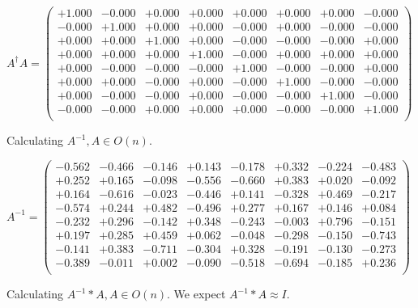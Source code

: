 \documentclass[9pt]{article}
\theoremstyle{plain}
\theoremstyle{definition}
\theoremstyle{remark}
\numberwithin{equation}{section}
\begin{document}
$A^{\dag} A = \left(
\begin{array}{
cccccccc}
+1.000 & -0.000 & +0.000 & +0.000 & +0.000 & +0.000 & +0.000 & -0.000 \\
-0.000 & +1.000 & +0.000 & +0.000 & -0.000 & +0.000 & -0.000 & -0.000 \\
+0.000 & +0.000 & +1.000 & +0.000 & -0.000 & -0.000 & -0.000 & +0.000 \\
+0.000 & +0.000 & +0.000 & +1.000 & -0.000 & +0.000 & +0.000 & +0.000 \\
+0.000 & -0.000 & -0.000 & -0.000 & +1.000 & -0.000 & -0.000 & +0.000 \\
+0.000 & +0.000 & -0.000 & +0.000 & -0.000 & +1.000 & -0.000 & -0.000 \\
+0.000 & -0.000 & -0.000 & +0.000 & -0.000 & -0.000 & +1.000 & -0.000 \\
-0.000 & -0.000 & +0.000 & +0.000 & +0.000 & -0.000 & -0.000 & +1.000 \\
\end{array}
\right)$ \newline 

Calculating $A^{-1} ,  A \in O(n)$.

$A^{-1} = \left(
\begin{array}{
cccccccc}
-0.562 & -0.466 & -0.146 & +0.143 & -0.178 & +0.332 & -0.224 & -0.483 \\
+0.252 & +0.165 & -0.098 & -0.556 & -0.660 & +0.383 & +0.020 & -0.092 \\
+0.164 & -0.616 & -0.023 & -0.446 & +0.141 & -0.328 & +0.469 & -0.217 \\
-0.574 & +0.244 & +0.482 & -0.496 & +0.277 & +0.167 & +0.146 & +0.084 \\
-0.232 & +0.296 & -0.142 & +0.348 & -0.243 & -0.003 & +0.796 & -0.151 \\
+0.197 & +0.285 & +0.459 & +0.062 & -0.048 & -0.298 & -0.150 & -0.743 \\
-0.141 & +0.383 & -0.711 & -0.304 & +0.328 & -0.191 & -0.130 & -0.273 \\
-0.389 & -0.011 & +0.002 & -0.090 & -0.518 & -0.694 & -0.185 & +0.236 \\
\end{array}
\right)$ \newline 

Calculating $A^{-1} *A  ,  A \in O(n)$.   We expect $A^{-1} *A  \approx I$. 
\end{document}
